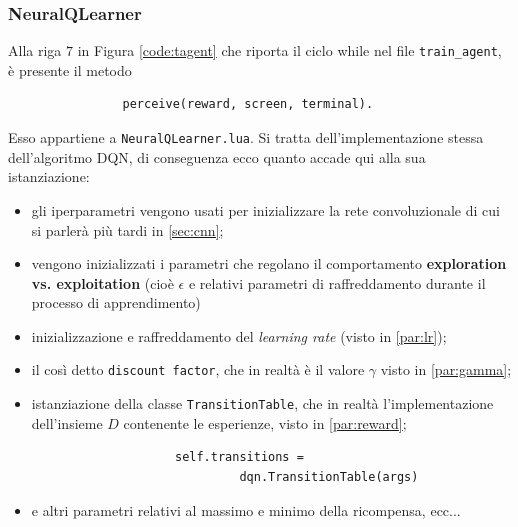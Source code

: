 \documentclass[twoside,twocolumn,10pt]{extarticle}
\theoremstyle{definition}
\begin{document}
		\subsubsection{NeuralQLearner}
			Alla riga $7$ in Figura \ref{code:tagent} che riporta il ciclo while nel file \texttt{train\_agent}, è presente il metodo
			\begin{verbatim}
				perceive(reward, screen, terminal).
			\end{verbatim}
			Esso appartiene a \texttt{NeuralQLearner.lua}. Si tratta dell'implementazione stessa dell'algoritmo DQN, di conseguenza ecco quanto accade qui alla sua istanziazione:
			\begin{itemize}
				\item gli iperparametri vengono usati per inizializzare la rete convoluzionale di cui si parlerà più tardi in \ref{sec:cnn};
				\item vengono inizializzati i parametri che regolano il comportamento \textbf{exploration vs. exploitation} (cioè $\epsilon$ e relativi parametri di raffreddamento durante il processo di apprendimento)
				\item inizializzazione e raffreddamento del \textit{learning rate} (visto in \ref{par:lr});
				\item il così detto \texttt{discount factor}, che in realtà è il valore $\gamma$ visto in \ref{par:gamma};
				\item istanziazione della classe \texttt{TransitionTable}, che in realtà l'implementazione dell'insieme $D$ contenente le esperienze, visto in \ref{par:reward};
				\begin{verbatim}
					self.transitions = 
					         dqn.TransitionTable(args)
				\end{verbatim}
				\item e altri parametri relativi al massimo e minimo della ricompensa, ecc...
			\end{itemize}
			
\end{document}
